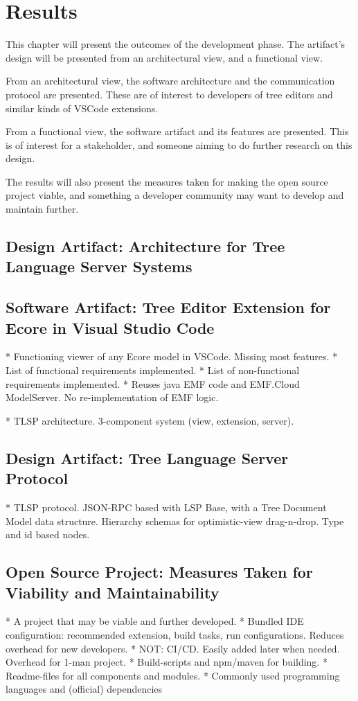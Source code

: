 \chapter{Results}\label{chap:results}

This chapter will present the outcomes of the development phase.
The artifact's design will be presented from an architectural view, and a functional view.

From an architectural view, the software architecture and the communication protocol are presented.
These are of interest to developers of tree editors and similar kinds of \gls{VSCode} extensions.

From a functional view, the software artifact and its features are presented.
This is of interest for a stakeholder, and someone aiming to do further research on this design.

The results will also present the measures taken for making the \gls{open source} project viable, and something a developer community may want to develop and maintain further.


\section{Design Artifact: Architecture for Tree Language Server Systems}




\section{Software Artifact: Tree Editor Extension for Ecore in Visual Studio Code}
* Functioning viewer of any Ecore model in VSCode. Missing most features.
  * List of functional requirements implemented.
  * List of non-functional requirements implemented.
* Reuses java EMF code and EMF.Cloud ModelServer. No re-implementation of EMF logic.

* TLSP architecture. 3-component system (view, extension, server).

\section{Design Artifact: Tree Language Server Protocol}

* TLSP protocol. JSON-RPC based with LSP Base, with a Tree Document Model data structure. Hierarchy schemas for optimistic-view drag-n-drop. Type and id based nodes. 

\section{Open Source Project: Measures Taken for Viability and Maintainability}

* A project that may be viable and further developed.
  * Bundled IDE configuration: recommended extension, build tasks, run configurations. Reduces overhead for new developers.
  * NOT: CI/CD. Easily added later when needed. Overhead for 1-man project.
  * Build-scripts and npm/maven for building.
  * Readme-files for all components and modules.
  * Commonly used programming languages and (official) dependencies
  
